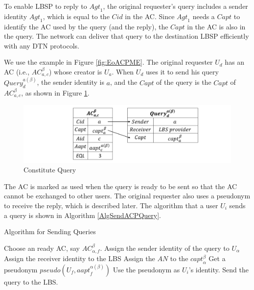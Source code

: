 To enable LBSP to reply to ${Agt}_1$, the original requester's query includes a sender identity ${Agt}_1$, which is equal to the $Cid$ in the AC. Since ${Agt}_1$ needs a ${Capt}$ to identify the AC used by the query (and the reply), the ${Capt}$ in the AC is also in the query. The network can deliver that query to the destination LBSP efficiently with any DTN protocols.

We use the example in Figure \ref{fig:EoACPME}. The original requester $U_d$ has an AC (i.e., ${AC}^{\beta }_{a,c}$) whose creator is $U_a$. When $U_d$ uses it to send his query ${Query}^{a\left(\beta\right)}_d$, the sender identity is $a$, and the $Capt$ of the query is the $Capt$ of ${AC}^{\beta }_{a,c}$, as shown in Figure \ref{fig:ConstituteQuery}.

\begin{figure} [H]
  \centering 
  \includegraphics[width=6.0in]{figures/FIG_4_5_Constitute_Query.png}
  \caption{Constitute Query} 
  \label{fig:ConstituteQuery} %
\end{figure}

The AC is marked as used when the query is ready to be sent so that the AC cannot be exchanged to other users. The original requester also uses a pseudonym to receive the reply, which is described later. The algorithm that a user $U_i$ sends a query is shown in Algorithm \ref{AlgSendACPQuery}.


\begin{algorithm} [hbtp]
\caption{Algorithm for Sending Queries}\label{AlgSendACPQuery}
\begin{algorithmic}[1]
 {}
\State Choose an ready AC, say ${AC}_{\alpha,f}^{\beta}$.
\State Assign the sender identity of the query to $U_{\alpha}$
\State Assign the receiver identity to the LBS
\State Assign the $AN$ to the ${capt}_{\alpha}^{\beta}$
\State Get a pseudonym $pseudo\left(U_f,{aapt}_f^{\alpha \left(\beta \right)}\right)$
\State Use the pseudonym as $U_i$’s identity.
\State Send the query to the LBS.
\EndProcedure
\end{algorithmic}
\end{algorithm}

